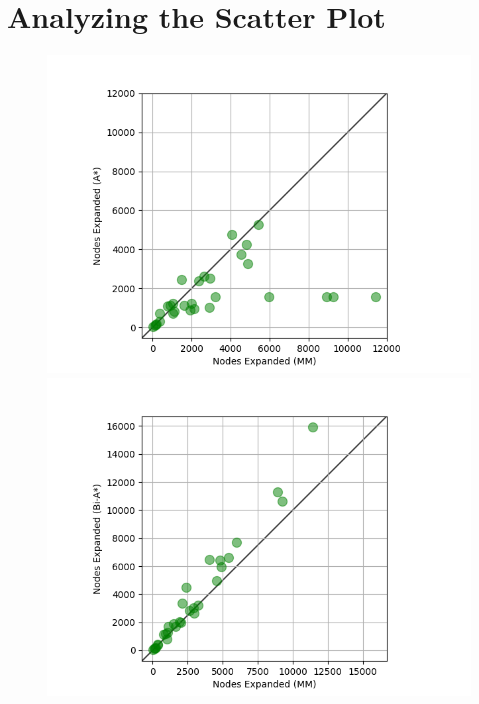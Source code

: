 \documentclass[8pt, letterpaper, titlepage]{article}
\title{\textbf{\Huge{ 
\begin{center}
MATE 201\\ \large{Class notes} %
\end{center} 
}}}
\author{Lora Ma}
\begin{document}
\section*{Analyzing the Scatter Plot}
\begin{figure}[H]
  \begin{center}    
    \includegraphics[width=\linewidth*3/6]{image.png}
    \includegraphics[width=\linewidth*3/6]{image1.png}
  \end{center}
\end{figure}
\end{document}
